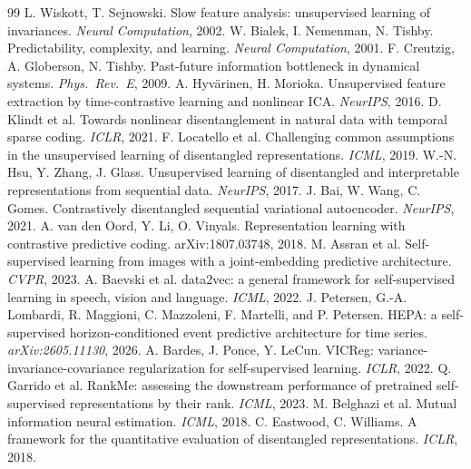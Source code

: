 \documentclass[10pt,twocolumn]{article}
\begin{document}
{\footnotesize
\begin{thebibliography}{99}\setlength{\itemsep}{0pt}
 L. Wiskott, T. Sejnowski. Slow feature analysis:
unsupervised learning of invariances. \emph{Neural Computation}, 2002.
 W. Bialek, I. Nemenman, N. Tishby.
Predictability, complexity, and learning. \emph{Neural Computation}, 2001.
 F. Creutzig, A. Globerson, N. Tishby.
Past-future information bottleneck in dynamical systems. \emph{Phys.\ Rev.\ E},
2009.
 A. Hyv\"arinen, H. Morioka. Unsupervised
feature extraction by time-contrastive learning and nonlinear ICA.
\emph{NeurIPS}, 2016.
 D. Klindt et al. Towards nonlinear disentanglement
in natural data with temporal sparse coding. \emph{ICLR}, 2021.
 F. Locatello et al. Challenging common
assumptions in the unsupervised learning of disentangled representations.
\emph{ICML}, 2019.
 W.-N. Hsu, Y. Zhang, J. Glass. Unsupervised
learning of disentangled and interpretable representations from sequential
data. \emph{NeurIPS}, 2017.
 J. Bai, W. Wang, C. Gomes. Contrastively
disentangled sequential variational autoencoder. \emph{NeurIPS}, 2021.
 A. van den Oord, Y. Li, O. Vinyals.
Representation learning with contrastive predictive coding.
arXiv:1807.03748, 2018.
 M. Assran et al. Self-supervised learning from images
with a joint-embedding predictive architecture. \emph{CVPR}, 2023.
 A. Baevski et al. data2vec: a general framework
for self-supervised learning in speech, vision and language. \emph{ICML}, 2022.
 J. Petersen, G.-A. Lombardi, R. Maggioni, C. Mazzoleni, F.
Martelli, and P. Petersen. HEPA: a self-supervised horizon-conditioned event
predictive architecture for time series. \emph{arXiv:2605.11130}, 2026.
 A. Bardes, J. Ponce, Y. LeCun. VICReg:
variance-invariance-covariance regularization for self-supervised learning.
\emph{ICLR}, 2022.
 Q. Garrido et al. RankMe: assessing the downstream
performance of pretrained self-supervised representations by their rank.
\emph{ICML}, 2023.
 M. Belghazi et al. Mutual information neural
estimation. \emph{ICML}, 2018.
 C. Eastwood, C. Williams. A framework for the
quantitative evaluation of disentangled representations. \emph{ICLR}, 2018.

\end{thebibliography}}
\end{document}
